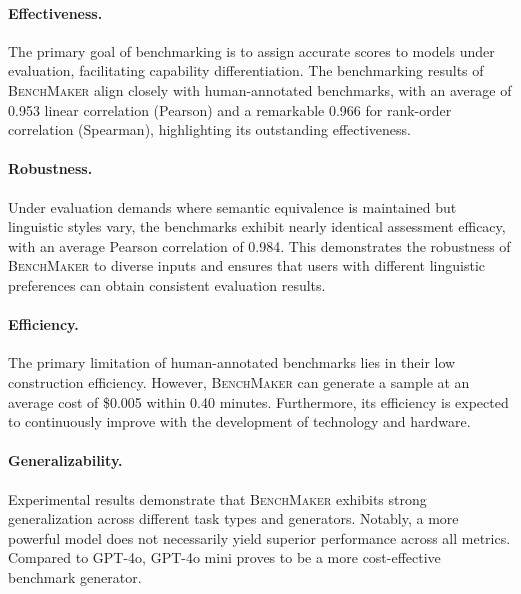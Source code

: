 \paragraph{Effectiveness.} 
The primary goal of benchmarking is to assign accurate scores to models under evaluation, facilitating capability differentiation. The benchmarking results of \textsc{BenchMaker} align closely with human-annotated benchmarks, with an average of 0.953 linear correlation (Pearson) and a remarkable 0.966 for rank-order correlation (Spearman), highlighting its outstanding effectiveness.
\paragraph{Robustness.}
Under evaluation demands where semantic equivalence is maintained but linguistic styles vary, the benchmarks exhibit nearly identical assessment efficacy, with an average Pearson correlation of 0.984. This demonstrates the robustness of \textsc{BenchMaker} to diverse inputs and ensures that users with different linguistic preferences can obtain consistent evaluation results.
\paragraph{Efficiency.}
The primary limitation of human-annotated benchmarks lies in their low construction efficiency. However, \textsc{BenchMaker} can generate a sample at an average cost of \$0.005 within 0.40 minutes. Furthermore, its efficiency is expected to continuously improve with the development of technology and hardware.

\paragraph{Generalizability.}
Experimental results demonstrate that \textsc{BenchMaker} exhibits strong generalization across different task types and generators. Notably, a more powerful model does not necessarily yield superior performance across all metrics. Compared to GPT-4o, GPT-4o mini proves to be a more cost-effective benchmark generator.


